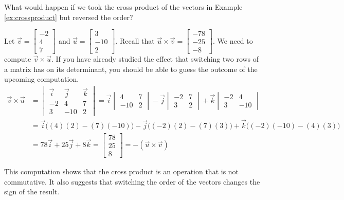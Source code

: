 \documentclass{ximera}
\begin{document}
\begin{initprob}\label{init:crossproduct2}
What would happen if we took the cross product of the vectors in Example \ref{ex:crossproduct} but reversed the order?

Let $\vec{v}=\begin{bmatrix}-2\\ 4\\ 7\end{bmatrix}$ and $\vec{u}=\begin{bmatrix}3\\ -10\\ 2\end{bmatrix}$.
Recall that $\vec{u}\times\vec{v}=\begin{bmatrix}-78\\-25\\-8\end{bmatrix}$.  We need to compute $\vec{v}\times\vec{u}$.  If you have already studied the effect that switching two rows of a matrix has on its determinant, you should be able to guess the outcome of the upcoming computation.
\begin{align*}
\vec{v}\times \vec{u}&=
\begin{vmatrix}
\vec{i} & \vec{j} & \vec{k}\\
-2 &4 &7\\
3 & -10 &2
\end{vmatrix} =\vec{i}
\begin{vmatrix}
4 & 7\\
-10 & 2
\end{vmatrix} -\vec{j}
\begin{vmatrix}
-2 & 7\\
3 & 2
\end{vmatrix} +\vec{k}
\begin{vmatrix}
-2 & 4\\
3 & -10
\end{vmatrix}\\
&=\vec{i}\Big((4)(2)-(7)(-10)\Big)-\vec{j}\Big((-2)(2)-(7)(3)\Big)+\vec{k}\Big((-2)(-10)-(4)(3)\Big)\\
&=78\vec{i}+25\vec{j}+8\vec{k}
=\begin{bmatrix}78\\ 25\\ 8\end{bmatrix}=-(\vec{u}\times\vec{v})
\end{align*}

This computation shows that the cross product is an operation that is not commutative. It also suggests that switching the order of the vectors changes the sign of the result.
\end{initprob}
\end{document}
